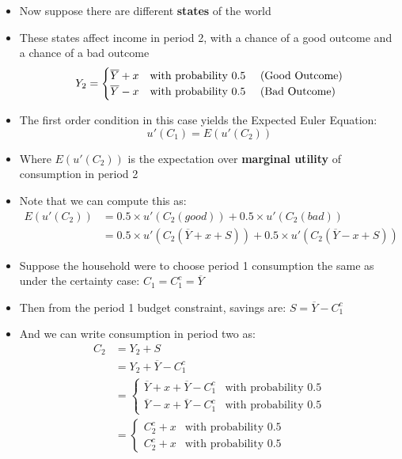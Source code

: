 \documentclass[a4paper]{article}
\begin{document}
	\begin{itemize}
		\item Now suppose there are different \textbf{states} of the world
		\item These states affect income in period 2, with a chance of a good outcome and a chance of a bad outcome
		\[	
			Y_2= 
			\begin{cases}
				\overline{Y} + x & \text{with probability 0.5 \quad (Good Outcome)} \\
				\overline{Y} - x & \text{with probability 0.5 \quad (Bad Outcome)}
			\end{cases}
		\]
		\item The first order condition in this case yields the \textcolor{myblue}{Expected Euler Equation:}
		\[
			u'(C_1) = E(u'(C_2))
		\]
		\item Where \( E(u'(C_2)) \) is the expectation over \textbf{marginal utility} of consumption in period 2
		\item Note that we can compute this as:
		\begin{align*}
			E(u'(C_2)) &= 0.5 \times u'(C_2(good)) + 0.5 \times u'(C_2(bad)) \\
			&= 0.5 \times u'(C_2(\overline{Y} + x + S)) + 0.5 \times u'(C_2(\overline{Y} - x + S))
		\end{align*}
		\item Suppose the household were to choose period 1 consumption the same as under the certainty case: \( C_1 = C_1^c = \overline{Y} \)
		\item Then from the period 1 budget constraint, savings are: \( S = \overline{Y} - C_1^c \)
		\item And we can write consumption in period two as:
		\begin{align*}
			C_2 &= Y_2 + S \\
			&= Y_2 + \overline{Y} - C_1^c \\
			&=
			\begin{cases}
				\overline{Y} + x + \overline{Y} - C_1^c & \text{with probability 0.5} \\
				\overline{Y} - x + \overline{Y} - C_1^c & \text{with probability 0.5}
			\end{cases}
			\\
			&=
			\begin{cases}
				C_2^c + x & \text{with probability 0.5} \\
				C_2^c + x & \text{with probability 0.5}
			\end{cases}
		\end{align*}

\end{itemize}
\end{document}
